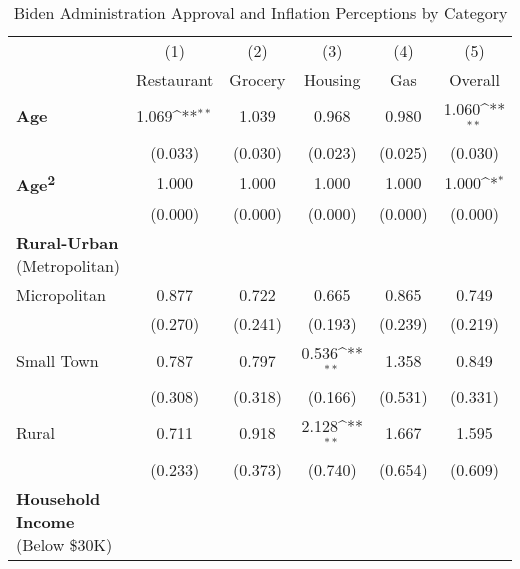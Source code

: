 \begin{table}[htbp]\centering \scriptsize
\label{tab:job}
\def\sym#1{\ifmmode^{#1}\else\(^{#1}\)\fi}
\caption{Biden Administration Approval and Inflation Perceptions by Category}
\begin{tabular}{l*{5}{c}}
\hline\hline
                    &\multicolumn{1}{c}{(1)}&\multicolumn{1}{c}{(2)}&\multicolumn{1}{c}{(3)}&\multicolumn{1}{c}{(4)}&\multicolumn{1}{c}{(5)}\\
                    &\multicolumn{1}{c}{Restaurant}&\multicolumn{1}{c}{Grocery}&\multicolumn{1}{c}{Housing}&\multicolumn{1}{c}{Gas}&\multicolumn{1}{c}{Overall}\\
\hline
\textbf{Age}        &       1.069\sym{**} &       1.039         &       0.968         &       0.980         &       1.060\sym{**} \\
                    &     (0.033)         &     (0.030)         &     (0.023)         &     (0.025)         &     (0.030)         \\
\textbf{Age\textsuperscript{2}}&       1.000         &       1.000         &       1.000         &       1.000         &       1.000\sym{*}  \\
                    &     (0.000)         &     (0.000)         &     (0.000)         &     (0.000)         &     (0.000)         \\
\textbf{Rural-Urban} (Metropolitan) &  &  &  &   & \\
Micropolitan        &       0.877         &       0.722         &       0.665         &       0.865         &       0.749         \\
                    &     (0.270)         &     (0.241)         &     (0.193)         &     (0.239)         &     (0.219)         \\
Small Town          &       0.787         &       0.797         &       0.536\sym{**} &       1.358         &       0.849         \\
                    &     (0.308)         &     (0.318)         &     (0.166)         &     (0.531)         &     (0.331)         \\
Rural               &       0.711         &       0.918         &       2.128\sym{**} &       1.667         &       1.595         \\
                    &     (0.233)         &     (0.373)         &     (0.740)         &     (0.654)         &     (0.609)         \\
\textbf{Household Income} (Below \$30K) &  &  &  &   & \\

\end{tabular}
\end{table}
